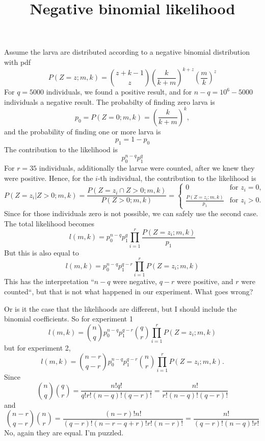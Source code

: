 \documentclass[a4paper, notitlepage]{article}
\begin{document}
\title{Negative binomial likelihood}
\maketitle
Assume the larva are distributed according to a negative binomial distribution with pdf
\[
P(Z=z; m,k ) = \binom{z+k-1}{z} \left( \frac{k}{k+m}\right)^{k+z} \left(\frac{m}{k}\right)^z
\]
For $q=5000$ individuals, we found a positive result, and for $n-q=10^6-5000$ individuals a negative result. The probabilty of finding zero larva is
\[
p_0 = P(Z=0; m,k ) = \left( \frac{k}{k+m}\right)^{k},
\]
and the probability of finding one or more larva is
\[
p_1 = 1-p_0
\]
The contribution to the likelihood is
\[
p_0^{n-q} p_1^q
\]
For $r=35$ individuals, additionally the larvae were counted, after we knew they were positive. Hence, for the $i$-th individual, the contribution to the likelihood is
\[
P( Z=z_i | Z>0 ; m,k) = \frac{ P( Z=z_i \cap Z>0 ; m,k) }{P(Z>0;m,k)} = 
\begin{cases}
0 & \mbox{for $z_i=0$},\\
\frac{ P( Z=z_i; m,k) }{p_1} & \mbox{for $z_i>0$}.
\end{cases}
\]
Since for those individuals zero is not possible, we can safely use the second case. The total likelihood becomes
\[
l(m,k) = p_0^{n-q} p_1^q \prod_{i=1}^r \frac{ P( Z=z_i; m,k) }{p_1}
\]
But this is also equal to
\[
l(m,k) = p_0^{n-q} p_1^{q-r} \prod_{i=1}^r P( Z=z_i; m,k)
\]
This has the interpretation ``$n-q$ were negative, $q-r$ were positive, and $r$ were counted``, but that is not what happened in our experiment. What goes wrong? 

Or is it the case that the likelihoods are different, but I should include the binomial coefficients. So for experiment 1
\[
l(m,k) = \binom{n}{q} p_0^{n-q} p_1^{q-r} \binom{q}{r}\prod_{i=1}^r P( Z=z_i; m,k)
\]
but for experiment 2,
\[
l(m,k) = \binom{n-r}{q-r} p_0^{n-q} p_1^{q-r} \binom{n}{r}\prod_{i=1}^r P( Z=z_i; m,k).
\]
Since
\[
\binom{n}{q}\binom{q}{r} = \frac{ n! q! }{q! r! (n-q)! (q-r)!}=\frac{ n! }{ r! (n-q)! (q-r)!}
\]
and
\[
\binom{n-r}{q-r} \binom{n}{r} =\frac{ (n-r)! n! }{(q-r)! (n-r-q+r)! r! (n-r)! } =\frac{ n! }{(q-r)! (n-q)! r!  }
\]
No, again they are equal. I'm puzzled.
\end{document}
